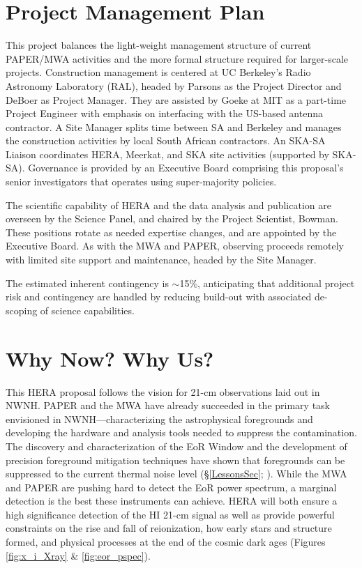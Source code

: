 \documentclass[preprint]{aastex}
\def\HI{{H{\small I }}}
\begin{document}
\vspace{-0.25in}
\section{Project Management Plan}
\label{PMPsec}

This project balances the light-weight management structure of current PAPER/MWA
activities and the more formal structure required for larger-scale projects.
Construction management is centered at UC Berkeley's Radio Astronomy Laboratory
(RAL), headed by Parsons as the Project Director and DeBoer as
Project Manager. 
They are assisted by Goeke at MIT as a part-time
Project Engineer with emphasis on interfacing with the US-based
antenna contractor.  A Site Manager splits time between SA
and Berkeley and manages the construction activities by local South African
contractors. An SKA-SA Liaison coordinates HERA, Meerkat, and SKA site
activities (supported by SKA-SA). Governance is provided by an Executive Board comprising
this proposal's senior investigators that operates using
super-majority policies. 

The scientific capability of HERA and the data analysis and publication are
overseen by the Science Panel, and chaired by the Project Scientist, Bowman. These
positions rotate as needed expertise changes, and are appointed by the
Executive Board.  As with the MWA and PAPER, observing
proceeds remotely with limited site support
and maintenance, headed by the Site Manager.

The estimated inherent contingency is $\sim$15\%, anticipating that additional project 
risk and contingency are handled by reducing
build-out with associated de-scoping of science capabilities.

\vspace{-0.25in}
\section{Why Now? Why Us?}

This HERA proposal follows the vision for 21-cm observations laid out in NWNH.
PAPER and the MWA have already succeeded in the primary task envisioned in
NWNH---characterizing the astrophysical foregrounds and developing the hardware
and analysis 
tools needed to suppress the contamination. The discovery and
characterization of the EoR Window and the development of precision foreground
mitigation techniques have shown that foregrounds can be suppressed to the current
thermal noise level (\S \ref{LessonsSec}; \citealt{parsons_et_al2013}). While the MWA
and PAPER are pushing hard to detect the EoR power spectrum, %
a marginal detection is the best these instruments can achieve.
HERA will both ensure a high significance detection of the \HI 21-cm 
signal as
well as provide powerful constraints on the rise and fall of reionization, how
early stars and structure formed, and physical processes at the end of the
cosmic dark ages (Figures \ref{fig:x_i_Xray} \& \ref{fig:eor_pspec}).
\end{document}
